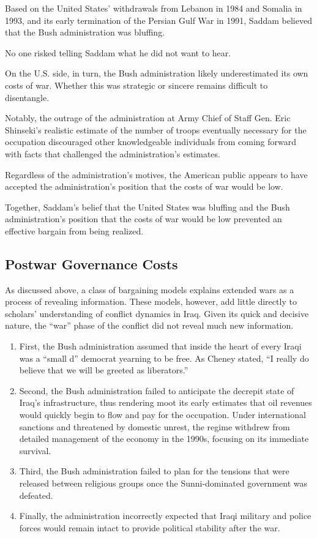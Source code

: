 Based on the United States' withdrawals from Lebanon in 1984 and Somalia in 1993, and its early termination of the Persian Gulf War in 1991, Saddam believed that the Bush administration was bluffing.

No one risked telling Saddam what he did not want to hear.

On the U.S. side, in turn, the Bush administration likely underestimated its own costs of war. Whether this was strategic or sincere remains difficult to disentangle.

Notably, the outrage of the administration at Army Chief of Staff Gen. Eric Shinseki's realistic estimate of the number of troops eventually necessary for the occupation discouraged other knowledgeable individuals from coming forward with facts that challenged the administration's estimates.

Regardless of the administration's motives, the American public appears to have accepted the administration's position that the costs of war would be low.

Together, Saddam's belief that the United States was bluffing and the Bush administration's position that the costs of war would be low prevented an effective bargain from being realized.

\subsection{Postwar Governance Costs}
As discussed above, a class of bargaining models explains extended wars as a process of revealing information. These models, however, add little directly to scholars' understanding of conflict dynamics in Iraq. Given its quick and decisive nature, the ``war'' phase of the conflict did not reveal much new information.

\begin{enumerate}
    \item First, the Bush administration assumed that inside the heart of every Iraqi was a ``small d'' democrat yearning to be free. As Cheney stated, ``I really do believe that we will be greeted as liberators.''

    \item Second, the Bush administration failed to anticipate the decrepit state of Iraq's infrastructure, thus rendering moot its early estimates that oil revenues would quickly begin to flow and pay for the occupation. Under international sanctions and threatened by domestic unrest, the regime withdrew from detailed management of the economy in the 1990s, focusing on its immediate survival.

    \item Third, the Bush administration failed to plan for the tensions that were released between religious groups once the Sunni-dominated government was defeated.

    \item Finally, the administration incorrectly expected that Iraqi military and police forces would remain intact to provide political stability after the war.
\end{enumerate}

